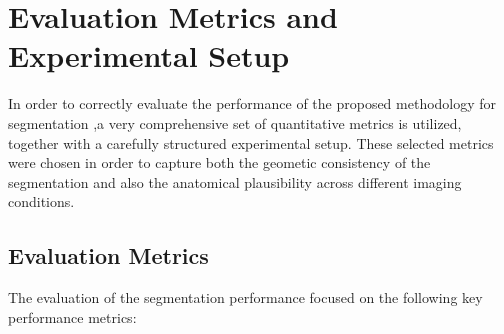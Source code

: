 \section{Evaluation Metrics and Experimental Setup}
In order to correctly evaluate the performance of the proposed methodology for segmentation ,a very comprehensive set of quantitative metrics is utilized, together with a carefully structured experimental setup. These selected metrics were chosen in order to capture both the geometic consistency of the segmentation and also the anatomical plausibility across different imaging conditions.

\subsection{Evaluation Metrics}
The evaluation of the segmentation performance focused on the following key performance metrics:

